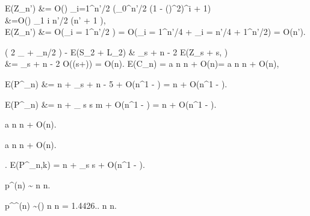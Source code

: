 \documentclass[prodmode,acmtalg]{acmsmall}
\let\accentvec\vec
\let\vec\accentvec
\newcommand{\E}{\textnormal{\textrm{E}}}
\begin{document}
\E(Z_{n'}) &=  O\left(\right) \sum_{i=1}^{n'/2}  \left(\int_0^{n'/2} 
    \left(1 - \left(\right)^2\right)^{i} \text{ } + 1\right)\\
    &=O\left(\right) \sum_{1 \leq i \leq n'/2}  
        \cdot \left(n' \cdot {} + 1 \right),\\

    \E(Z_{n'}) &= O\left(\sum_{i = 1}^{n'/2} \right) = O\left(\sum_{i = 1}^{n'/4}  + 
    \sum_{i = n'/4 + 1}^{n'/2}\right) = O(\log n').

     \left( 2 \sum_{} \ell + \sum_{\ell \leq n/2} \ell\right) - \E(S_2 + L_2) & \leq {} \sum_{s + \ell \leq n - 2} \E(Z_{s + \ell} \mid
    s, \ell) \\ &=  \sum_{s + \ell \leq n - 2} O(\log (s+\ell)) = 
    O(\log n).
\label{eq:1000}
    \E(C_n) =  \cdot a \cdot n \ln n  + O(n)=  \cdot a \cdot n \ln n + O(n),

    \E(P^_n) &= n  + 
    \sum_{s + \ell \leq n - 5}  + O(n^{1 - \varepsilon}) = n + O(n^{1 - \varepsilon}).

    \E(P^_n) &=  n +  
    \sum_{} s \cdot s \cdot m \cdot
    \ell + O(n^{1 - \varepsilon}) = n + O(n^{1 - \varepsilon}).

	     \cdot a \cdot n \ln n + O(n).
	    
	     \cdot a \cdot n \ln n + O(n).
	    
    .
\label{eq:700}
    \E(P^_{n,k}) = n +  \sum_{s
    \leq \ell} \cdot s + O(n^{1 - \varepsilon}).

	p^{\vec{\tau}}(n) \sim {} n \ln n.
    
    p^{\vec{\tau}^\ast}\!(n) \sim \left(\right) n \ln n = 1.4426.. n \ln
    n.
\end{document}
